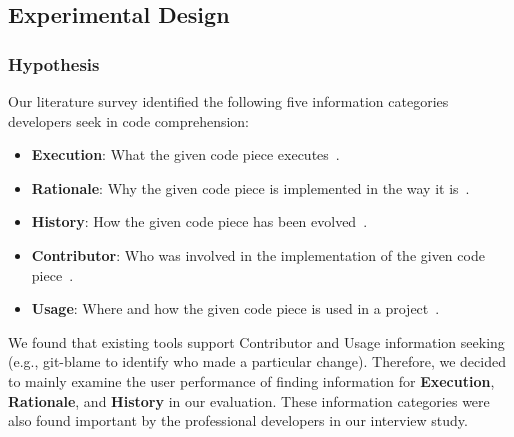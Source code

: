 \subsection{Experimental Design}

\subsubsection{Hypothesis}
Our literature survey identified the following five information categories developers seek in code comprehension:

\begin{itemize}
\setlength{\itemsep}{0cm}
\item \textbf{Execution}: What the given code piece executes~\cite{Information_Needs_in_Collocated_Software_Development_Teams}.
\item \textbf{Rationale}: Why the given code piece is implemented in the way it is~\cite{Information_Needs_in_Collocated_Software_Development_Teams}.
\item \textbf{History}: How the given code piece has been evolved~\cite{Chronicler}.
\item \textbf{Contributor}: Who was involved in the implementation of the given code piece~\cite{Who_can_help_me_with_this_source_code_change}.
\item \textbf{Usage}: Where and how the given code piece is used in a project~\cite{Six_Learning_Barriers_in_End_User_Programming_Systems}.
\end{itemize}

We found that existing tools support Contributor and Usage information seeking (e.g., git-blame to identify who made a particular change).
Therefore, we decided to mainly examine the user performance of finding information for \textbf{Execution}, \textbf{Rationale}, and \textbf{History} in our evaluation.
These information categories were also found important by the professional developers in our interview study.





